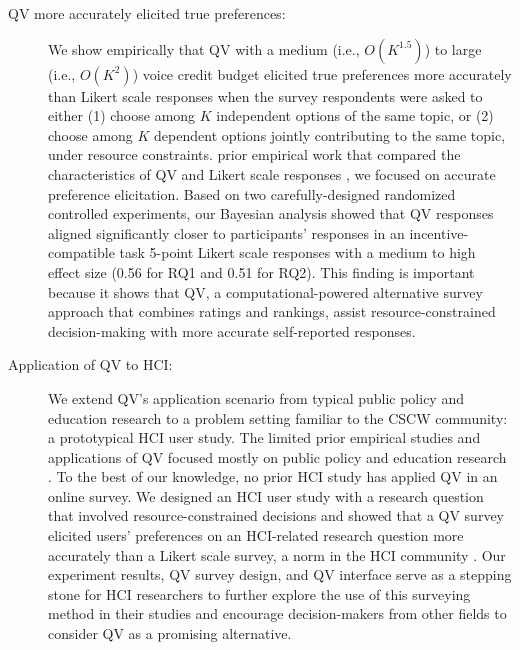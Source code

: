 \begin{description}
\item[QV more accurately elicited true preferences:] We show empirically that QV with a medium (i.e., $O(K^{1.5})$) to large (i.e., $O(K^{2})$) voice credit budget elicited true preferences more accurately than Likert scale responses when the survey respondents were asked to either (1) choose among $K$ independent options of the same topic, or (2) choose among $K$ dependent options jointly contributing to the same topic, under resource constraints.  prior empirical work that compared the characteristics of QV and Likert scale responses \cite{quarfoot2017quadratic, naylor2017first}, we focused on accurate preference elicitation. Based on two carefully-designed randomized controlled experiments, our Bayesian analysis showed that QV responses aligned significantly closer to participants' responses in an incentive-compatible task  5-point Likert scale responses with a medium to high effect size (0.56 for RQ1 and 0.51 for RQ2). This finding is important because it shows that QV, a computational-powered alternative survey approach that combines ratings and rankings,  assist resource-constrained decision-making with more accurate self-reported responses.
\item[Application of QV to HCI:] We extend QV's application scenario from typical public policy and education research to a problem setting familiar to the CSCW community: a prototypical HCI user study. The limited prior empirical studies and applications of QV focused mostly on public policy \cite{quarfoot2017quadratic, colorado_qv} and education research \cite{naylor2017first}. To the best of our knowledge, no prior HCI study has applied QV in an online survey. We designed an HCI user study with a research question that involved resource-constrained decisions and showed that a QV survey elicited users' preferences on an HCI-related research question more accurately than a Likert scale survey, a norm in the HCI community \cite{ledo2018evaluation}. Our experiment results, QV survey design, and QV interface serve as a stepping stone for HCI researchers to further explore the use of this surveying method in their studies and encourage decision-makers from other fields to consider QV as a promising alternative.
\end{description}

